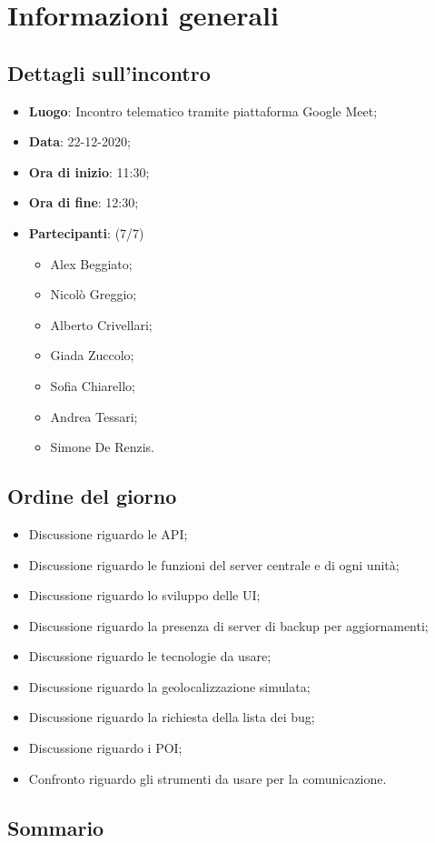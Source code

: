 \section{Informazioni generali}

\subsection{Dettagli sull'incontro}
\begin{itemize}
\item \textbf{Luogo}: Incontro telematico tramite piattaforma Google Meet;
\item \textbf{Data}: 22-12-2020;
\item \textbf{Ora di inizio}: 11:30;
\item \textbf{Ora di fine}: 12:30;
\item \textbf{Partecipanti}: (7/7) 
\begin{itemize}
	\item Alex Beggiato;
	\item Nicolò Greggio;
	\item Alberto Crivellari;
	\item Giada Zuccolo;
	\item Sofia Chiarello;
	\item Andrea Tessari;
	\item Simone De Renzis.
\end{itemize}
\end{itemize}

\subsection{Ordine del giorno}
\begin{itemize}
	\item Discussione riguardo le API;
	\item Discussione riguardo le funzioni del server centrale e di ogni unità;
	\item Discussione riguardo lo sviluppo delle UI;
	\item Discussione riguardo la presenza di server di backup per aggiornamenti;
	\item Discussione riguardo le tecnologie da usare;
	\item Discussione riguardo la geolocalizzazione simulata;
	\item Discussione riguardo la richiesta della lista dei bug;
	\item Discussione riguardo i POI;
	\item Confronto riguardo gli strumenti da usare per la comunicazione.
\end{itemize}

\subsection{Sommario}


